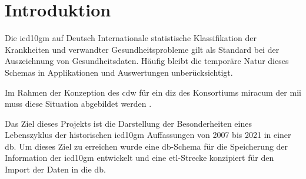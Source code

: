 \chapter{Introduktion}

	Die \ac{icd10gm} auf Deutsch Internationale statistische Klassifikation der Krankheiten und  verwandter Gesundheitsprobleme \cite{icd10} gilt als Standard bei der Auszeichnung von Gesundheitsdaten. Häufig bleibt die temporäre Natur dieses Schemas in Applikationen und Auswertungen unberücksichtigt.
	
	Im Rahmen der Konzeption des \ac{cdw} für ein  \ac{diz} des Konsortiums \ac{miracum} der \ac{mii} muss diese Situation abgebildet werden \cite{willidea}. 
	
	Das Ziel dieses Projekts ist die Darstellung der Besonderheiten eines Lebenszyklus der historischen \ac{icd10gm} Auffassungen von 2007 bis 2021 in einer \ac{db}. Um dieses Ziel zu erreichen wurde eine \ac{db}-Schema für die Speicherung der Information der \ac{icd10gm} entwickelt und eine \ac{etl}-Strecke konzipiert für den Import der Daten in die \ac{db}.
	
	